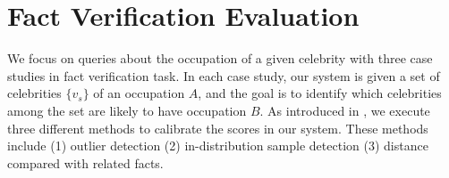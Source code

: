 \section{Fact Verification Evaluation}\label{sec:ali_fact_ver_eval}
We focus on queries about the occupation of a given celebrity with three case studies in fact verification task. In each case study, our system is given a set of celebrities $\{v_s\}$ of an occupation $A$, and the goal is to identify which celebrities among the set are likely to have occupation $B$. 
As introduced in , we execute three different methods to calibrate the scores in our system. These methods include (1) outlier detection 
(2) in-distribution sample detection 
(3) distance compared with related facts.


